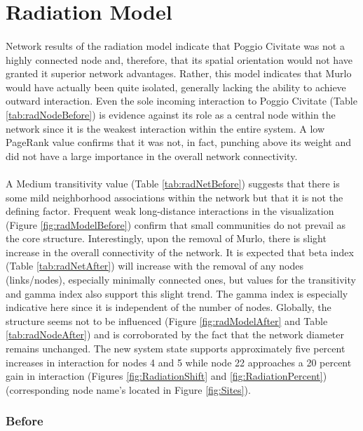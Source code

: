 \documentclass[12pt,a4paper]{thesis}
\begin{document}
\section{Radiation Model} 

\paragraph{}
Network results of the radiation model indicate that Poggio Civitate was not a highly connected node and, therefore,  that its spatial orientation would not have granted it superior network advantages. Rather, this model indicates that Murlo would have actually been quite isolated, generally lacking the ability to achieve outward interaction. Even the sole incoming interaction to Poggio Civitate (Table \ref{tab:radNodeBefore}) is evidence against its role as a central node within the network since it is the weakest interaction within the entire system. A low PageRank value confirms that it was not, in fact, punching above its weight and did not have a large importance in the overall network connectivity. 

\paragraph{}
A Medium transitivity value (Table \ref{tab:radNetBefore}) suggests that there is some mild neighborhood associations within the network but that it is not the defining factor. Frequent weak long-distance interactions in the visualization (Figure \ref{fig:radModelBefore}) confirm that small communities do not prevail as the core structure. Interestingly, upon the removal of Murlo, there is slight increase in the overall connectivity of the network. It is expected that beta index (Table \ref{tab:radNetAfter}) will increase with the removal of any nodes (links/nodes), especially minimally connected ones, but values for the transitivity and gamma index also support this slight trend. The gamma index is especially indicative here since it is independent of the number of nodes. Globally, the structure seems not to be influenced (Figure \ref{fig:radModelAfter} and Table \ref{tab:radNodeAfter}) and is corroborated by the fact that the network diameter remains unchanged. The new system state supports approximately five percent increases in interaction for nodes 4 and 5 while node 22 approaches a 20 percent gain in interaction (Figures \ref{fig:RadiationShift} and \ref{fig:RadiationPercent}) (corresponding node name's located in Figure \ref{fig:Sites}). 
\subsubsection{Before}
\end{document}
